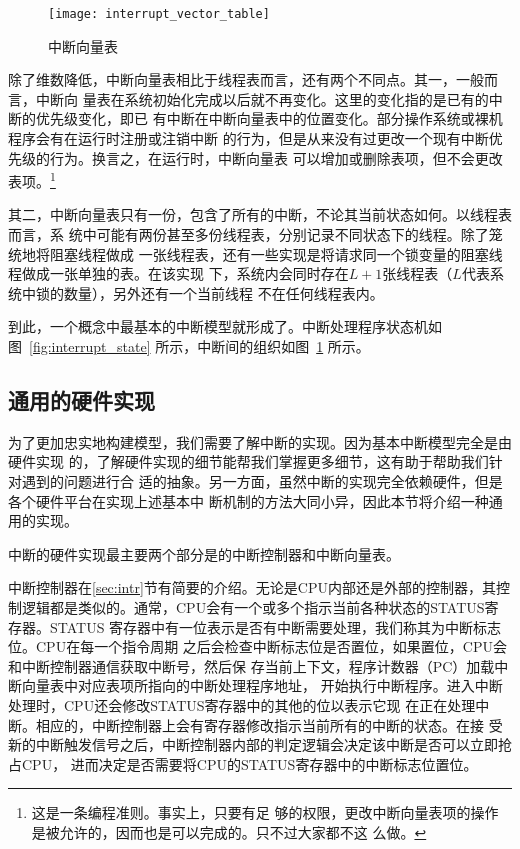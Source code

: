 \begin{figure}[H]
	\centering
	\texttt{[image: interrupt\_vector\_table]}
	\caption{中断向量表}
	\label{fig:interrupt_vector_table}
\end{figure}

除了维数降低，中断向量表相比于线程表而言，还有两个不同点。其一，一般而言，中断向
量表在系统初始化完成以后就不再变化。这里的变化指的是已有的中断的优先级变化，即已
有中断在中断向量表中的位置变化。部分操作系统或裸机程序会有在运行时注册或注销中断
的行为，但是从来没有过更改一个现有中断优先级的行为。换言之，在运行时，中断向量表
可以增加或删除表项，但不会更改表项。\footnote{这是一条编程准则。事实上，只要有足
够的权限，更改中断向量表项的操作是被允许的，因而也是可以完成的。只不过大家都不这
么做。}

其二，中断向量表只有一份，包含了所有的中断，不论其当前状态如何。以线程表而言，系
统中可能有两份甚至多份线程表，分别记录不同状态下的线程。除了笼统地将阻塞线程做成
一张线程表，还有一些实现是将请求同一个锁变量的阻塞线程做成一张单独的表。在该实现
下，系统内会同时存在$L+1$张线程表（$L$代表系统中锁的数量），另外还有一个当前线程
不在任何线程表内。

到此，一个概念中最基本的中断模型就形成了。中断处理程序状态机如图~\ref{fig:interrupt_state} 
所示，中断间的组织如图~\ref{fig:interrupt_vector_table} 所示。

\subsection{通用的硬件实现}
\label{subsec:basic_hardware}

为了更加忠实地构建模型，我们需要了解中断的实现。因为基本中断模型完全是由硬件实现
的，了解硬件实现的细节能帮我们掌握更多细节，这有助于帮助我们针对遇到的问题进行合
适的抽象。另一方面，虽然中断的实现完全依赖硬件，但是各个硬件平台在实现上述基本中
断机制的方法大同小异，因此本节将介绍一种通用的实现。

中断的硬件实现最主要两个部分是的中断控制器和中断向量表。

中断控制器在\ref{sec:intr}节有简要的介绍。无论是CPU内部还是外部的控制器，其控
制逻辑都是类似的。通常，CPU会有一个或多个指示当前各种状态的STATUS寄存器。STATUS
寄存器中有一位表示是否有中断需要处理，我们称其为中断标志位。CPU在每一个指令周期
之后会检查中断标志位是否置位，如果置位，CPU会和中断控制器通信获取中断号，然后保
存当前上下文，程序计数器（PC）加载中断向量表中对应表项所指向的中断处理程序地址，
开始执行中断程序。进入中断处理时，CPU还会修改STATUS寄存器中的其他的位以表示它现
在正在处理中断。相应的，中断控制器上会有寄存器修改指示当前所有的中断的状态。在接
受新的中断触发信号之后，中断控制器内部的判定逻辑会决定该中断是否可以立即抢占CPU，
进而决定是否需要将CPU的STATUS寄存器中的中断标志位置位。

